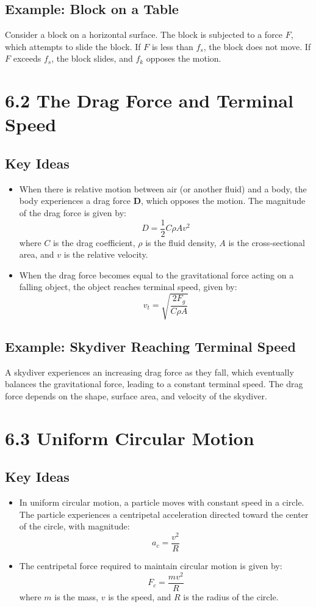 \documentclass{article}
\begin{document}
\subsection*{Example: Block on a Table}
Consider a block on a horizontal surface. The block is subjected to a force $F$, which attempts to slide the block. If $F$ is less than $f_s$, the block does not move. If $F$ exceeds $f_s$, the block slides, and $f_k$ opposes the motion.

\section*{6.2 The Drag Force and Terminal Speed}

\subsection*{Key Ideas}
\begin{itemize}
    \item When there is relative motion between air (or another fluid) and a body, the body experiences a drag force $\mathbf{D}$, which opposes the motion. The magnitude of the drag force is given by:
    \[
    D = \frac{1}{2}C \rho A v^2
    \]
    where $C$ is the drag coefficient, $\rho$ is the fluid density, $A$ is the cross-sectional area, and $v$ is the relative velocity.
    \item When the drag force becomes equal to the gravitational force acting on a falling object, the object reaches terminal speed, given by:
    \[
    v_t = \sqrt{\frac{2F_g}{C \rho A}}
    \]
\end{itemize}

\subsection*{Example: Skydiver Reaching Terminal Speed}
A skydiver experiences an increasing drag force as they fall, which eventually balances the gravitational force, leading to a constant terminal speed. The drag force depends on the shape, surface area, and velocity of the skydiver.

\section*{6.3 Uniform Circular Motion}

\subsection*{Key Ideas}
\begin{itemize}
    \item In uniform circular motion, a particle moves with constant speed in a circle. The particle experiences a centripetal acceleration directed toward the center of the circle, with magnitude:
    \[
    a_c = \frac{v^2}{R}
    \]
    \item The centripetal force required to maintain circular motion is given by:
    \[
    F_c = \frac{mv^2}{R}
    \]
    where $m$ is the mass, $v$ is the speed, and $R$ is the radius of the circle.
\end{itemize}
\end{document}
